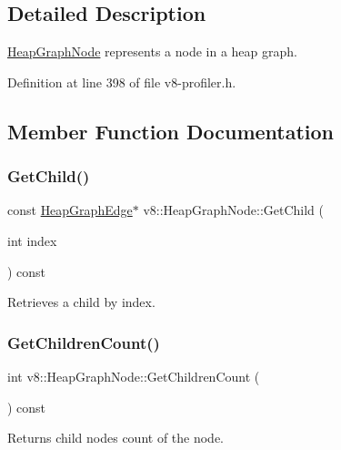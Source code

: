 \subsection{Detailed Description}
\mbox{\hyperlink{classv8_1_1HeapGraphNode}{Heap\+Graph\+Node}} represents a node in a heap graph. 

Definition at line 398 of file v8-\/profiler.\+h.



\subsection{Member Function Documentation}
\mbox{\label{classv8_1_1HeapGraphNode_a3dc91726c26eb1c167706b112cd74564}} 
\subsubsection{\texorpdfstring{Get\+Child()}{GetChild()}}
{\footnotesize\ttfamily const \mbox{\hyperlink{classv8_1_1HeapGraphEdge}{Heap\+Graph\+Edge}}$\ast$ v8\+::\+Heap\+Graph\+Node\+::\+Get\+Child (\begin{DoxyParamCaption}\item[{int}]{index }\end{DoxyParamCaption}) const}

Retrieves a child by index. \mbox{\label{classv8_1_1HeapGraphNode_afb0afb27e5d5ae27b54376bc69f095ae}} 
\subsubsection{\texorpdfstring{Get\+Children\+Count()}{GetChildrenCount()}}
{\footnotesize\ttfamily int v8\+::\+Heap\+Graph\+Node\+::\+Get\+Children\+Count (\begin{DoxyParamCaption}{ }\end{DoxyParamCaption}) const}

Returns child nodes count of the node. \mbox{\label{classv8_1_1HeapGraphNode_a62cd677be9c23067c6e2394b1fd154c6}} 
